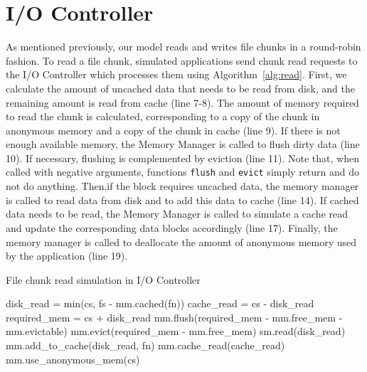 \section{I/O Controller}

As mentioned previously, our model reads and writes file chunks in a
round-robin fashion. To read a file chunk, simulated applications send
chunk read requests to the I/O Controller which processes them using
Algorithm~\ref{alg:read}. First, we calculate the amount of uncached
data that needs to be read from disk, and the remaining amount is read
from cache (line 7-8). The amount of memory required to read the chunk
is calculated, corresponding to a copy of the chunk in anonymous memory
and a copy of the chunk in cache (line 9).
If there is not enough available memory, the Memory Manager is called
to flush dirty data (line 10). If necessary, flushing is complemented by
eviction (line 11). Note that, when called with negative arguments, functions
\texttt{flush} and \texttt{evict} simply return and do not do anything. 
Then,if the block requires uncached data, the memory manager is called 
to read data from disk and to add this data to cache (line 14).
If cached data needs to be read, the Memory Manager is called to simulate
a cache read  and update the corresponding data blocks accordingly (line 17).
Finally, the memory manager is called to deallocate the amount of anonymous 
memory used by the application (line 19).

\begin{algorithm}[H]
\caption{File chunk read simulation in I/O Controller}
\label{alg:read}
    \small
    \begin{algorithmic}[1]
        \Input
           \EndInput
           \State disk\_read = min(cs, fs - mm.cached(fn)) 
           \State cache\_read = cs - disk\_read 
           \State required\_mem = cs + disk\_read
           \State mm.flush(required\_mem - mm.free\_mem - mm.evictable)
           \State mm.evict(required\_mem - mm.free\_mem)
             
           \State sm.read(disk\_read)
           \State mm.add\_to\_cache(disk\_read, fn)
           \EndIf
            
           \State mm.cache\_read(cache\_read)
        \EndIf
        \State mm.use\_anonymous\_mem(cs)
    \end{algorithmic}
\end{algorithm}

